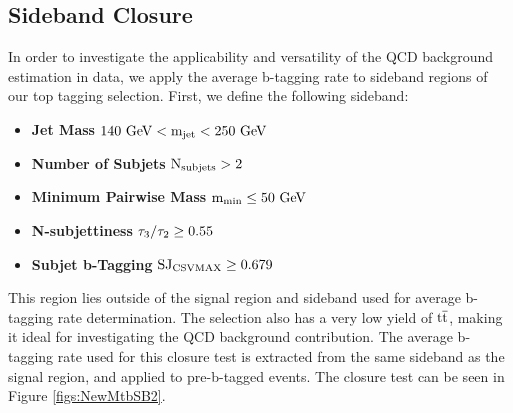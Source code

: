 \subsection{Sideband Closure}
\label{sec:secondsideband}
In order to investigate the applicability and versatility of the QCD background estimation in data, we apply the average b-tagging rate to sideband regions of our top tagging selection.  First, we define the following sideband:

\begin{itemize}
\item {\bf Jet Mass}  $\mathrm{\boldmath 140~\mathrm{GeV} < m_{\text{jet}} < 250~\mathrm{GeV}}$ 
\item {\bf Number of Subjets}  $\mathrm{\boldmath N_{\text{subjets}} > 2}$ 
\item {\bf Minimum Pairwise Mass} $\mathrm{\boldmath m_{\text{min}} \leq 50~\mathrm{GeV}}$ 
\item {\bf N-subjettiness} $\mathrm{\boldmath \tau_3/\tau_2 \geq 0.55}$ 
\item {\bf Subjet b-Tagging} $\mathrm{\boldmath SJ_{\text{CSVMAX}} \geq 0.679}$ 
\end{itemize}
This region lies outside of the signal region and sideband used for average b-tagging rate determination.  
The selection also has a very low yield of $\mathrm{t\overline{t}}$, making it ideal for investigating the QCD background contribution.  
The average b-tagging rate used for this closure test is extracted from the same sideband as the signal region, and applied to pre-b-tagged events.  The closure test can be seen in Figure \ref{figs:NewMtbSB2}.

